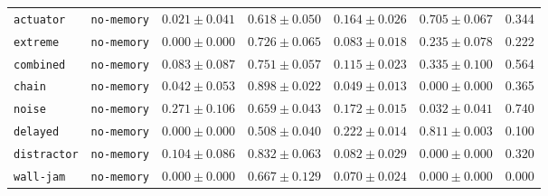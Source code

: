 \documentclass{article}
\begin{document}
\begin{center}
\begin{tabular}{llccccc}
\texttt{actuator} & \texttt{no-memory} & $0.021 \pm 0.041$ & $0.618 \pm 0.050$ & $0.164 \pm 0.026$ & $0.705 \pm 0.067$ & 0.344 \\
\texttt{extreme} & \texttt{no-memory} & $0.000 \pm 0.000$ & $0.726 \pm 0.065$ & $0.083 \pm 0.018$ & $0.235 \pm 0.078$ & 0.222 \\
\texttt{combined} & \texttt{no-memory} & $0.083 \pm 0.087$ & $0.751 \pm 0.057$ & $0.115 \pm 0.023$ & $0.335 \pm 0.100$ & 0.564 \\
\texttt{chain} & \texttt{no-memory} & $0.042 \pm 0.053$ & $0.898 \pm 0.022$ & $0.049 \pm 0.013$ & $0.000 \pm 0.000$ & 0.365 \\
\texttt{noise} & \texttt{no-memory} & $0.271 \pm 0.106$ & $0.659 \pm 0.043$ & $0.172 \pm 0.015$ & $0.032 \pm 0.041$ & 0.740 \\
\texttt{delayed} & \texttt{no-memory} & $0.000 \pm 0.000$ & $0.508 \pm 0.040$ & $0.222 \pm 0.014$ & $0.811 \pm 0.003$ & 0.100 \\
\texttt{distractor} & \texttt{no-memory} & $0.104 \pm 0.086$ & $0.832 \pm 0.063$ & $0.082 \pm 0.029$ & $0.000 \pm 0.000$ & 0.320 \\
\texttt{wall-jam} & \texttt{no-memory} & $0.000 \pm 0.000$ & $0.667 \pm 0.129$ & $0.070 \pm 0.024$ & $0.000 \pm 0.000$ & 0.000 \\
\bottomrule
\end{tabular}
\end{center}
\end{document}
